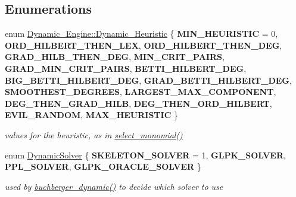 \subsection*{Enumerations}
\begin{DoxyCompactItemize}
\item 
enum \hyperlink{group___g_b_computation_ga819b1fd40d9a40ff303df3b90647ecb0}{Dynamic\+\_\+\+Engine\+::\+Dynamic\+\_\+\+Heuristic} \{ \newline
{\bfseries M\+I\+N\+\_\+\+H\+E\+U\+R\+I\+S\+T\+IC} = 0, 
{\bfseries O\+R\+D\+\_\+\+H\+I\+L\+B\+E\+R\+T\+\_\+\+T\+H\+E\+N\+\_\+\+L\+EX}, 
{\bfseries O\+R\+D\+\_\+\+H\+I\+L\+B\+E\+R\+T\+\_\+\+T\+H\+E\+N\+\_\+\+D\+EG}, 
{\bfseries G\+R\+A\+D\+\_\+\+H\+I\+L\+B\+\_\+\+T\+H\+E\+N\+\_\+\+D\+EG}, 
\newline
{\bfseries M\+I\+N\+\_\+\+C\+R\+I\+T\+\_\+\+P\+A\+I\+RS}, 
{\bfseries G\+R\+A\+D\+\_\+\+M\+I\+N\+\_\+\+C\+R\+I\+T\+\_\+\+P\+A\+I\+RS}, 
{\bfseries B\+E\+T\+T\+I\+\_\+\+H\+I\+L\+B\+E\+R\+T\+\_\+\+D\+EG}, 
{\bfseries B\+I\+G\+\_\+\+B\+E\+T\+T\+I\+\_\+\+H\+I\+L\+B\+E\+R\+T\+\_\+\+D\+EG}, 
\newline
{\bfseries G\+R\+A\+D\+\_\+\+B\+E\+T\+T\+I\+\_\+\+H\+I\+L\+B\+E\+R\+T\+\_\+\+D\+EG}, 
{\bfseries S\+M\+O\+O\+T\+H\+E\+S\+T\+\_\+\+D\+E\+G\+R\+E\+ES}, 
{\bfseries L\+A\+R\+G\+E\+S\+T\+\_\+\+M\+A\+X\+\_\+\+C\+O\+M\+P\+O\+N\+E\+NT}, 
{\bfseries D\+E\+G\+\_\+\+T\+H\+E\+N\+\_\+\+G\+R\+A\+D\+\_\+\+H\+I\+LB}, 
\newline
{\bfseries D\+E\+G\+\_\+\+T\+H\+E\+N\+\_\+\+O\+R\+D\+\_\+\+H\+I\+L\+B\+E\+RT}, 
{\bfseries E\+V\+I\+L\+\_\+\+R\+A\+N\+D\+OM}, 
{\bfseries M\+A\+X\+\_\+\+H\+E\+U\+R\+I\+S\+T\+IC}
 \}\begin{DoxyCompactList}\small\item\em values for the heuristic, as in {\ttfamily \hyperlink{group___g_b_computation_gaa01d88c431b84deabf51ee116d7d2a0e}{select\+\_\+monomial()}} \end{DoxyCompactList}
\item 
enum \hyperlink{group___g_b_computation_ga28fbbb9eb7d8b80ced05c8fa89b2bdac}{Dynamic\+Solver} \{ {\bfseries S\+K\+E\+L\+E\+T\+O\+N\+\_\+\+S\+O\+L\+V\+ER} = 1, 
{\bfseries G\+L\+P\+K\+\_\+\+S\+O\+L\+V\+ER}, 
{\bfseries P\+P\+L\+\_\+\+S\+O\+L\+V\+ER}, 
{\bfseries G\+L\+P\+K\+\_\+\+O\+R\+A\+C\+L\+E\+\_\+\+S\+O\+L\+V\+ER}
 \}\begin{DoxyCompactList}\small\item\em used by \hyperlink{group___g_b_computation_ga2c05f4e2ea8b43bb696483469f4cce83}{buchberger\+\_\+dynamic()} to decide which solver to use \end{DoxyCompactList}

\end{DoxyCompactItemize}
